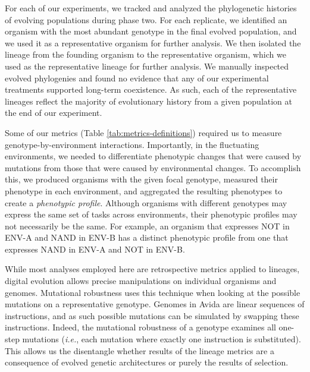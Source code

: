 For each of our experiments, we tracked and analyzed the phylogenetic histories of evolving populations during phase two. 
For each replicate, we identified an organism with the most abundant genotype in the final evolved population, and we used it as a representative organism for further analysis.
We then isolated the lineage from the founding organism to the representative organism, which we used as the representative lineage for further analysis.
We manually inspected evolved phylogenies and found no evidence that any of our experimental treatments supported long-term coexistence. 
As such, each of the representative lineages reflect the majority of evolutionary history from a given population at the end of our experiment.

Some of our metrics (Table \ref{tab:metrics-definitions}) required us to measure genotype-by-environment interactions.
Importantly, in the fluctuating environments, we needed to differentiate phenotypic changes that were caused by mutations from those that were caused by environmental changes.
To accomplish this, we produced organisms with the given focal genotype, measured their phenotype in each environment, and aggregated the resulting phenotypes to create a \textit{phenotypic profile}. 
Although organisms with different genotypes may express the same set of tasks across environments, their phenotypic profiles may not necessarily be the same.
For example, an organism that expresses NOT in ENV-A and NAND in ENV-B has a distinct phenotypic profile from one that expresses NAND in ENV-A and NOT in ENV-B.

While most analyses employed here are retrospective metrics applied to lineages, digital evolution allows precise manipulations on individual organisms and genomes. 
Mutational robustness uses this technique when looking at the possible mutations on a representative genotype. 
Genomes in Avida are linear sequences of instructions, and as such possible mutations can be simulated by swapping these instructions. 
Indeed, the mutational robustness of a genotype examines all one-step mutations (\textit{i.e.}, each mutation where exactly one instruction is substituted). 
This allows us the disentangle whether results of the lineage metrics are a consequence of evolved genetic architectures or purely the results of selection. 


